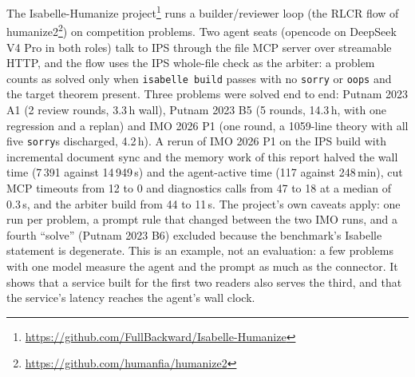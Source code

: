 \documentclass[11pt]{article}
\newcommand{\code}[1]{\colorbox{gray!12}{\texttt{\vphantom{Ag}#1}}}
\begin{document}
The Isabelle-Humanize
project\footnote{\url{https://github.com/FullBackward/Isabelle-Humanize}}
runs a builder/reviewer loop (the RLCR flow of
humanize2\footnote{\url{https://github.com/humanfia/humanize2}}) on
competition problems. Two agent seats (opencode on DeepSeek V4 Pro in
both roles) talk to IPS through the file MCP server over streamable HTTP,
and the flow uses the IPS whole-file check as the arbiter: a problem
counts as solved only when \code{isabelle build} passes with no
\code{sorry} or \code{oops} and the target theorem present. Three
problems were solved end to end: Putnam 2023 A1 (2 review rounds, 3.3\,h
wall), Putnam 2023 B5 (5 rounds, 14.3\,h, with
one regression and a replan) and IMO 2026 P1 (one round, a
1059-line theory with all five \code{sorry}s discharged, 4.2\,h). A rerun of IMO 2026 P1 on the IPS build with incremental document
sync and the memory work of this report halved the wall time (7\,391
against 14\,949\,s) and the agent-active time (117 against 248\,min),
cut MCP timeouts from 12 to 0 and diagnostics calls from 47 to 18 at a
median of 0.3\,s, and the arbiter build from 44 to 11\,s. The project's
own caveats apply: one run per problem, a prompt rule that changed between
the two IMO runs, and a
fourth ``solve'' (Putnam 2023 B6) excluded because the benchmark's Isabelle
statement is degenerate. This is an example, not an evaluation: a few
problems with one model measure the agent and the prompt as much as the
connector. It shows that a service built for the first two readers also
serves the third, and that the service's latency reaches the agent's wall
clock.
\end{document}
